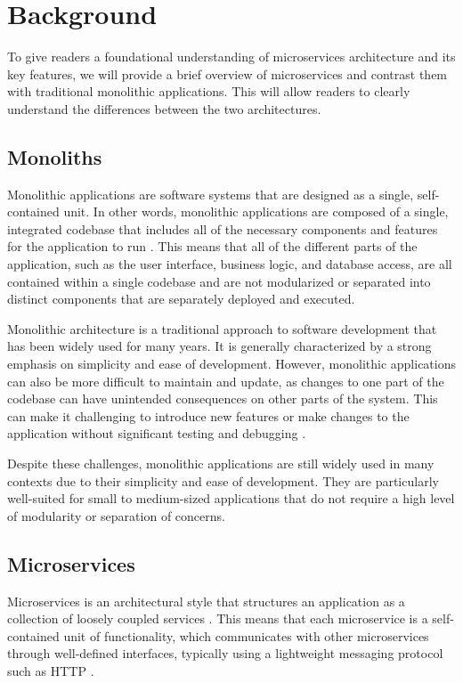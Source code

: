 \documentclass[conference]{IEEEtran}
\begin{document}
\section{Background}

To give readers a foundational understanding of microservices architecture and
its key features, we will provide a brief overview of microservices and
contrast them with traditional monolithic applications. This will allow readers
to clearly understand the differences between the two architectures.

\subsection{Monoliths}

Monolithic applications are software systems that are designed as a single,
self-contained unit. In other words, monolithic applications are composed of a
single, integrated codebase that includes all of the necessary components and
features for the application to run \cite{kazanavivcius2019migrating}. This
means that all of the different parts of the application, such as the user
interface, business logic, and database access, are all contained within a
single codebase and are not modularized or separated into distinct components
that are separately deployed and executed.

Monolithic architecture is a traditional approach to software development that
has been widely used for many years. It is generally characterized by a strong
emphasis on simplicity and ease of development. However, monolithic
applications can also be more difficult to maintain and update, as changes to
one part of the codebase can have unintended consequences on other parts of the
system. This can make it challenging to introduce new features or make changes
to the application without significant testing and debugging
\cite{kazanavivcius2019migrating}.

Despite these challenges, monolithic applications are still widely used in many
contexts due to their simplicity and ease of development. They are particularly
well-suited for small to medium-sized applications that do not require a high
level of modularity or separation of concerns.

\subsection{Microservices}

Microservices is an architectural style that structures an application as a
collection of loosely coupled services \cite{newman2021building}. This means
that each microservice is a self-contained unit of functionality, which
communicates with other microservices through well-defined interfaces,
typically using a lightweight messaging protocol such as HTTP
\cite{fowler-microservices}.
\end{document}
